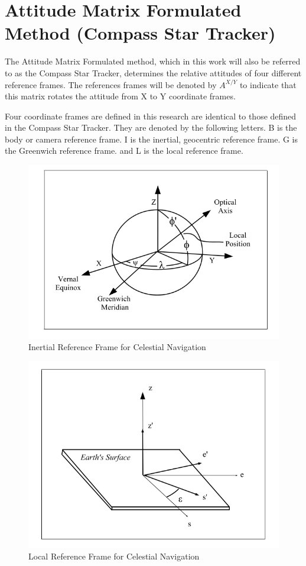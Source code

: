 \documentclass[12pt,a4paper]{book}
\begin{document}
\section{Attitude Matrix Formulated Method (Compass Star Tracker)}
The Attitude Matrix Formulated method, which in this work will also be referred to as the Compass Star Tracker, determines the relative attitudes of four different reference frames. The references frames will be denoted by \textbf{$A^{X/Y}$} to indicate that this matrix rotates the attitude from X to Y coordinate frames.   

Four coordinate frames are defined in this research are identical to those defined in the Compass Star Tracker.  They are denoted by the following letters. B is the body or camera reference frame.  I is the inertial, geocentric reference frame.  G is the Greenwich reference frame.  and L is the local reference frame.  

\begin{figure}[h!]
\centering
\includegraphics[scale=0.35]{inertial.png}
\caption{Inertial Reference Frame for Celestial Navigation}
\label{f:inertial}
\end{figure}

\begin{figure}[h!]
\centering
\includegraphics[scale=0.35]{local.png}
\caption{Local Reference Frame for Celestial Navigation}
\label{f:local}
\end{figure}
\end{document}
